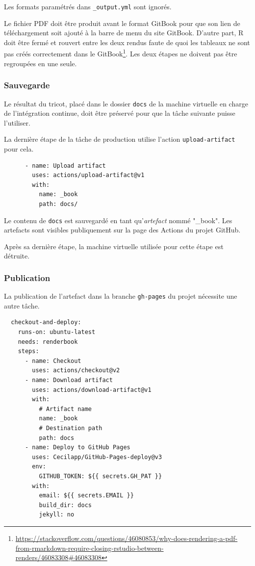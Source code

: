 \documentclass[
  12pt,
  french,
  a4paper,
  extrafontsizes,onecolumn,openright
  ]{memoir}
\newlength{\rf}
\begin{document}
Les formats paramétrés dans \texttt{\_output.yml} sont ignorés.

Le fichier PDF doit être produit avant le format GitBook pour que son lien de téléchargement soit ajouté à la barre de menu du site GitBook.
D'autre part, R doit être fermé et rouvert entre les deux rendus faute de quoi les tableaux ne sont pas créés correctement dans le GitBook\footnote{\url{https://stackoverflow.com/questions/46080853/why-does-rendering-a-pdf-from-rmarkdown-require-closing-rstudio-between-renders/46083308\#46083308}}.
Les deux étapes ne doivent pas être regroupées en une seule.

\hypertarget{sauvegarde}{%
\subsubsection{Sauvegarde}\label{sauvegarde}}

Le résultat du tricot, placé dans le dossier \texttt{docs} de la machine virtuelle en charge de l'intégration continue, doit être préservé pour que la tâche suivante puisse l'utiliser.

La dernière étape de la tâche de production utilise l'action \texttt{upload-artifact} pour cela.

\begin{verbatim}
      - name: Upload artifact
        uses: actions/upload-artifact@v1
        with:
          name: _book
          path: docs/
\end{verbatim}

Le contenu de \texttt{docs} est sauvegardé en tant qu'\emph{artefact} nommé "\_book".
Les artefacts sont visibles publiquement sur la page des Actions du projet GitHub.

Après sa dernière étape, la machine virtuelle utilisée pour cette étape est détruite.

\hypertarget{publication}{%
\subsubsection{Publication}\label{publication}}

La publication de l'artefact dans la branche \texttt{gh-pages} du projet nécessite une autre tâche.

\begin{verbatim}
  checkout-and-deploy:
    runs-on: ubuntu-latest
    needs: renderbook
    steps:
      - name: Checkout
        uses: actions/checkout@v2
      - name: Download artifact
        uses: actions/download-artifact@v1
        with:
          # Artifact name
          name: _book
          # Destination path
          path: docs
      - name: Deploy to GitHub Pages
        uses: Cecilapp/GitHub-Pages-deploy@v3
        env:
          GITHUB_TOKEN: ${{ secrets.GH_PAT }}
        with:
          email: ${{ secrets.EMAIL }}
          build_dir: docs
          jekyll: no
\end{verbatim}
\end{document}
